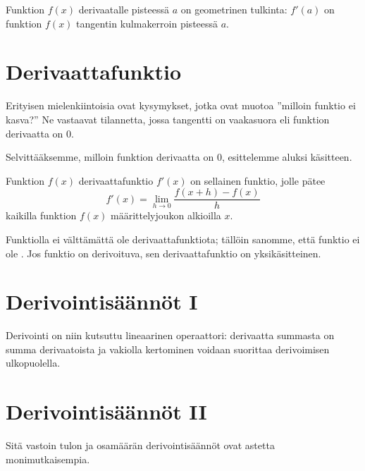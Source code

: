 Funktion $f(x)$ derivaatalle pisteessä $a$ on geometrinen tulkinta:
$f'(a)$ on funktion $f(x)$ tangentin kulmakerroin pisteessä $a$.

\section{Derivaattafunktio}

Erityisen mielenkiintoisia ovat kysymykset, jotka ovat muotoa
''milloin funktio ei kasva?'' Ne vastaavat tilannetta, jossa tangentti
on vaakasuora eli funktion derivaatta on $0$.

Selvittääksemme, milloin funktion derivaatta on $0$, esittelemme aluksi
 käsitteen.

Funktion $f(x)$ derivaattafunktio $f'(x)$ on sellainen funktio, jolle pätee
\[ f'(x) = \lim\limits_{h \to 0} \frac{f(x+h)-f(x)}{h} \]
kaikilla funktion $f(x)$ määrittelyjoukon alkioilla $x$.

Funktiolla ei välttämättä ole derivaattafunktiota; tällöin sanomme, että funktio
ei ole . Jos funktio on derivoituva, sen
derivaattafunktio on yksikäsitteinen.

\section{Derivointisäännöt I}


Derivointi on niin kutsuttu lineaarinen operaattori: derivaatta summasta on summa derivaatoista ja
vakiolla kertominen voidaan suorittaa derivoimisen ulkopuolella.

\section{Derivointisäännöt II}

Sitä vastoin tulon ja osamäärän derivointisäännöt ovat astetta monimutkaisempia.


